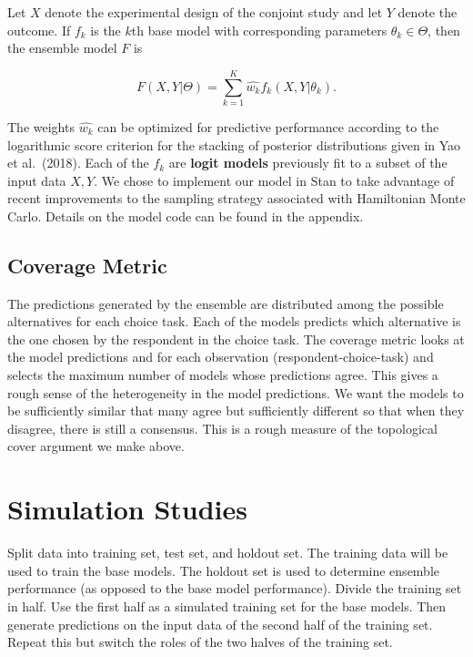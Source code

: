 \documentclass[12pt,titlepage]{mktg-article}
\begin{document}
Let \(X\) denote the experimental design of the conjoint study and let \(Y\) denote the outcome. If \(f_k\) is the \(k\)th base model with corresponding parameters \(\theta_k \in \Theta\), then the ensemble model \(F\) is

\[F(X,Y|\Theta) = \sum_{k=1}^K \hat{w_k} f_k(X, Y|\theta_k).\]

The weights \(\hat{w_k}\) can be optimized for predictive performance according to the logarithmic score criterion for the stacking of posterior distributions given in Yao et al.~(2018). Each of the \(f_k\) are \textbf{logit models} previously fit to a subset of the input data \(X,Y\). We chose to implement our model in Stan to take advantage of recent improvements to the sampling strategy associated with Hamiltonian Monte Carlo. Details on the model code can be found in the appendix.

\hypertarget{coverage-metric}{%
\subsection{Coverage Metric}\label{coverage-metric}}

The predictions generated by the ensemble are distributed among the possible alternatives for each choice task. Each of the models predicts which alternative is the one chosen by the respondent in the choice task. The coverage metric looks at the model predictions and for each observation (respondent-choice-task) and selects the maximum number of models whose predictions agree. This gives a rough sense of the heterogeneity in the model predictions. We want the models to be sufficiently similar that many agree but sufficiently different so that when they disagree, there is still a consensus. This is a rough measure of the topological cover argument we make above.

\hypertarget{simulation-studies}{%
\section{Simulation Studies}\label{simulation-studies}}

Split data into training set, test set, and holdout set. The training data will be used to train the base models. The holdout set is used to determine ensemble performance (as opposed to the base model performance). Divide the training set in half. Use the first half as a simulated training set for the base models. Then generate predictions on the input data of the second half of the training set. Repeat this but switch the roles of the two halves of the training set.
\end{document}
